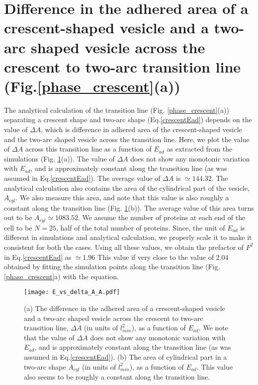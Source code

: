 \documentclass[pre,amsmath]{revtex4}
\begin{document}
\section{Difference in the adhered area of a crescent-shaped vesicle and a two-arc shaped vesicle across the crescent to two-arc transition line (Fig.\ref{phase_crescent}(a))}
\label{sec:delta_A}
The analytical calculation of the transition line (Fig. \ref{phase_crescent}(a)) separating a crescent shape and two-arc shape (Eq.\ref{crescentEad}) depends on the value of $\Delta A$, which is difference in adhered area of the crescent-shaped vesicle and the two-arc shaped vesicle across the transition line. Here, we plot the value of $\Delta A$ across this transition line as a function of $E_{ad}$ as extracted from the simulations (Fig. \ref{delta_A}(a)). The value of $\Delta A$ does not show any monotonic variation with $E_{ad}$, and is approximately constant along the transition line (as was assumed in Eq.\ref{crescentEad}). The average value of $\Delta A$ is $\simeq 144.32$. The analytical calculation also contains the area of the cylindrical part of the vesicle, $A_{cyl}$. We also measure this area, and note that this value is also roughly a constant along the transition line  (Fig. \ref{delta_A}(b)). The average value of this area turns out to be $A_{cyl} \simeq 1083.52$. We assume the number of proteins at each end of the cell to be $N=25$, half of the total number of proteins. Since, the unit of $E_{ad}$ is different in simulations and analytical calculation, we properly scale it to make it consistent for both the cases. Using all these values, we obtain the prefactor of $F^2$ in Eq.\ref{crescentEad} as $\simeq 1.96$ This value if very close to the value of $2.04$ obtained by fitting the simulation points along the transition line (Fig.\ref{phase_crescent}a) with the equation.
\begin{figure}[ht]
\centering
\texttt{[image: E\_vs\_delta\_A\_A.pdf]}
\caption{(a) The difference in the adhered area of a crescent-shaped vesicle and a two-arc shaped vesicle across the crescent to two-arc transition line, $\Delta A$ (in units of $l^2_{min}$), as a function of $E_{ad}$. We note that the value of $\Delta A$ does not show any monotonic variation with $E_{ad}$, and is approximately constant along the transition line (as was assumed in Eq.\ref{crescentEad}). (b) The area of cylindrical part in a two-arc shape $A_{cyl}$ (in units of $l^2_{min}$), as a function of $E_{ad}$. This value also seems to be roughly a constant along the transition line.}
\label{delta_A} 
\end{figure}
\end{document}
